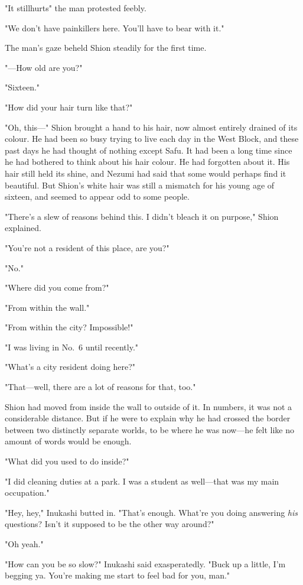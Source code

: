 "It still\el hurts\el " the man protested feebly.

"We don't have painkillers here. You'll have to bear with it."

The man's gaze beheld Shion steadily for the first time.

"---How old are you?"

"Sixteen."

"How did your hair turn like that?"

"Oh, this---" Shion brought a hand to his hair, now almost entirely
drained of its colour. He had been so busy trying to live each day in
the West Block, and these past days he had thought of nothing except
Safu. It had been a long time since he had bothered to think about his
hair colour. He had forgotten about it. His hair still held its shine,
and Nezumi had said that some would perhaps find it beautiful. But
Shion's white hair was still a mismatch for his young age of sixteen,
and seemed to appear odd to some people.

"There's a slew of reasons behind this. I didn't bleach it on purpose,"
Shion explained.

"You're not a resident of this place, are you?"

"No."

"Where did you come from?"

"From within the wall."

"From within the city? Impossible!"

"I was living in No.~6 until recently."

"What's a city resident doing here?"

"That---well, there are a lot of reasons for that, too."

Shion had moved from inside the wall to outside of it. In numbers, it
was not a considerable distance. But if he were to explain why he had
crossed the border between two distinctly separate worlds, to be where
he was now---he felt like no amount of words would be enough.

"What did you used to do inside?"

"I did cleaning duties at a park. I was a student as well---that was my
main occupation."

"Hey, hey," Inukashi butted in. "That's enough. What're you doing
answering \emph{his} questions? Isn't it supposed to be the other way around?"

"Oh yeah."

"How can you be so slow?" Inukashi said exasperatedly. "Buck up a
little, I'm begging ya. You're making me start to feel bad for you,
man."

